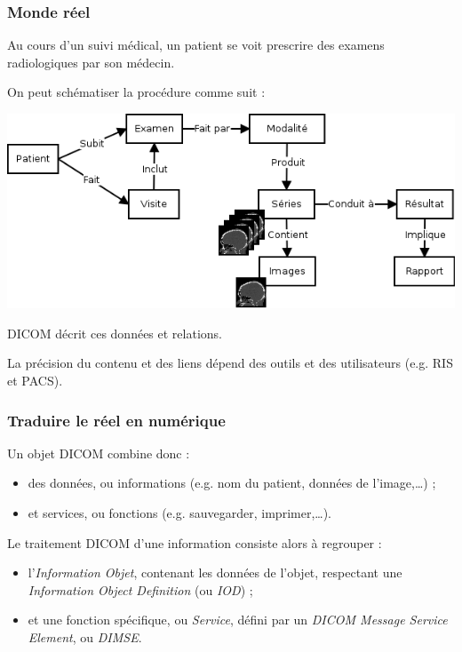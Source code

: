 	\frame
	{
		\frametitle{Monde r\'eel}
		Au cours d'un suivi m\'edical, un patient se voit prescrire des examens radiologiques par son m\'edecin.
		
		On peut sch\'ematiser la proc\'edure comme suit :
		
		\includegraphics[width=\linewidth]{./figures/scenario.png}
		
		DICOM d\'ecrit ces donn\'ees et relations.
		
		La pr\'ecision du contenu et des liens d\'epend des outils et des utilisateurs (e.g. RIS et PACS).
	}

	\frame
	{
		\frametitle{Traduire le r\'eel en num\'erique}
		
		Un objet DICOM combine donc :
		\begin{itemize}
			\item des donn\'ees, ou informations (e.g. nom du patient, donn\'ees de l'image,\ldots) ;
			\item et services, ou fonctions (e.g. sauvegarder, imprimer,\ldots).
		\end{itemize}
		
		Le traitement DICOM d'une information consiste alors \`a regrouper :
		\begin{itemize}
			\item l'\emph{Information Objet}, contenant les donn\'ees de l'objet, respectant une \emph{Information Object Definition} (ou \emph{IOD}) ;
			\item et une fonction sp\'ecifique, ou \emph{Service}, d\'efini par un \emph{DICOM Message Service Element}, ou \emph{DIMSE}.
		\end{itemize}
	}
	
